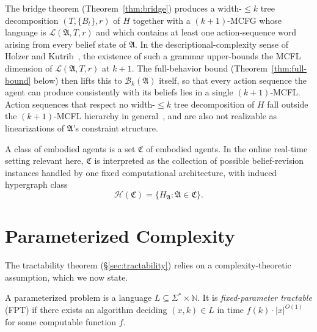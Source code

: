 \documentclass[runningheads]{llncs}
\begin{document}
\begin{remark}\label{rem:witness}
The bridge theorem (Theorem~\ref{thm:bridge}) produces a width-$\leq k$ tree decomposition $(T, \{B_t\}, r)$ of $H$ together with a $(k{+}1)$-MCFG whose language is $\mathcal{L}(\mathfrak{A}, T, r)$ and which contains at least one action-sequence word arising from every belief state of $\mathfrak{A}$. In the descriptional-complexity sense of Holzer and Kutrib~\cite{HolzerKutrib11}, the existence of such a grammar upper-bounds the MCFL dimension of $\mathcal{L}(\mathfrak{A}, T, r)$ at $k{+}1$. The full-behavior bound (Theorem~\ref{thm:full-bound} below) then lifts this to $\mathcal{B}_k(\mathfrak{A})$ itself, so that every action sequence the agent can produce consistently with its beliefs lies in a single $(k{+}1)$-MCFL. Action sequences that respect no width-$\leq k$ tree decomposition of $H$ fall outside the $(k{+}1)$-MCFL hierarchy in general~\cite{Seki91}, and are also not realizable as linearizations of $\mathfrak{A}$'s constraint structure.
\end{remark}

\begin{definition}\label{def:agent-class}
A class of embodied agents is a set $\mathfrak{C}$ of embodied agents. In the online real-time setting relevant here, $\mathfrak{C}$ is interpreted as the collection of possible belief-revision instances handled by one fixed computational architecture, with induced hypergraph class
\[
  \mathcal{H}(\mathfrak{C}) = \{ H_{\mathfrak{A}} : \mathfrak{A} \in \mathfrak{C} \}.
\]
\end{definition}

\section{Parameterized Complexity}\label{sec:complexity}

The tractability theorem (\S\ref{sec:tractability}) relies on a complexity-theoretic assumption, which we now state.

\begin{definition}\label{def:fpt}
A parameterized problem is a language $L \subseteq \Sigma^* \times \mathbb{N}$.
It is \emph{fixed-parameter tractable} (FPT) if there exists an algorithm deciding $(x, k) \in L$ in time $f(k) \cdot |x|^{O(1)}$ for some computable function $f$.
\end{definition}
\end{document}
